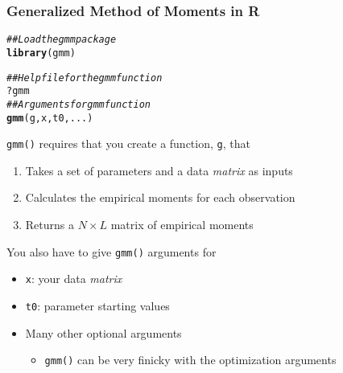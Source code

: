 \documentclass{beamer}\usepackage[]{graphicx}\usepackage[]{color}
\makeatletter
\newcommand{\hlcom}[1]{\textcolor[rgb]{0.678,0.584,0.686}{\textit{#1}}}%
\newcommand{\hlopt}[1]{\textcolor[rgb]{0,0,0}{#1}}%
\newcommand{\hlstd}[1]{\textcolor[rgb]{0.345,0.345,0.345}{#1}}%
\newcommand{\hlkwd}[1]{\textcolor[rgb]{0.737,0.353,0.396}{\textbf{#1}}}%
\newenvironment{kframe}{%
 \def\at@end@of@kframe{}%
 \ifinner\ifhmode%
  \def\at@end@of@kframe{\end{minipage}}%
  \begin{minipage}{\columnwidth}%
 \fi\fi%
 \def\FrameCommand##1{\hskip\@totalleftmargin \hskip-\fboxsep
 \colorbox{shadecolor}{##1}\hskip-\fboxsep
     \hskip-\linewidth \hskip-\@totalleftmargin \hskip\columnwidth}%
 \MakeFramed {\advance\hsize-\width
   \@totalleftmargin\z@ \linewidth\hsize
   \@setminipage}}%
 {\par\unskip\endMakeFramed%
 \at@end@of@kframe}
\newenvironment{knitrout}{}{} %
\makeatother
\begin{document}
\begin{frame}[fragile]\frametitle{Generalized Method of Moments in R}
\begin{knitrout}\footnotesize
{}\color{fgcolor}\begin{kframe}
\begin{alltt}
\hlcom{## Load the gmm package}
\hlkwd{library}\hlstd{(gmm)}
\end{alltt}
\end{kframe}
\end{knitrout}
\begin{knitrout}\footnotesize
{}\color{fgcolor}\begin{kframe}
\begin{alltt}
\hlcom{## Help file for the gmm function}
\hlopt{?}\hlstd{gmm}
\hlcom{## Arguments for gmm function}
\hlkwd{gmm}\hlstd{(g, x, t0, ...)}
\end{alltt}
\end{kframe}
\end{knitrout}
    \texttt{gmm()} requires that you create a function, \texttt{g}, that
    \begin{enumerate}
        \item Takes a set of parameters and a data \emph{matrix} as inputs
        \item Calculates the empirical moments for each observation
        \item Returns a $N \times L$ matrix of empirical moments
    \end{enumerate}
    You also have to give \texttt{gmm()} arguments for
    \begin{itemize}
        \item \texttt{x}: your data \emph{matrix}
        \item \texttt{t0}: parameter starting values
        \item Many other optional arguments
        \begin{itemize}
            \item \texttt{gmm()} can be very finicky with the optimization arguments
        \end{itemize}
    \end{itemize}
\end{frame}
\end{document}

